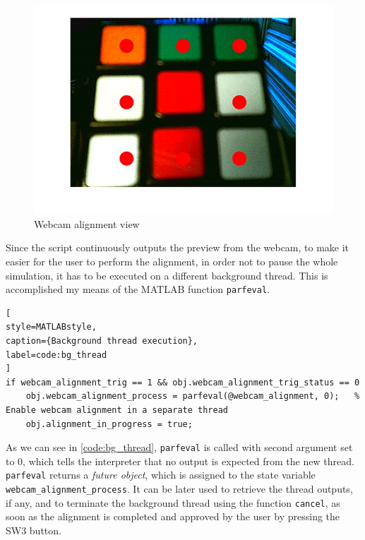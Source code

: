 \documentclass{report}
\begin{document}
\begin{figure}[h!]
    \centering
    \includegraphics[width=0.5\linewidth]{images/webcam_manager/alignment.jpg}
    \caption{Webcam alignment view}
    \label{fig:webcam_align_view}
\end{figure}

Since the script continuously outputs the preview from the webcam, to make it easier for the user to perform the alignment, in order not to pause the whole simulation, it has to be executed on a different background thread. This is accomplished my means of the MATLAB function \texttt{parfeval}.

\begin{lstlisting}[
style=MATLABstyle,
caption={Background thread execution},
label=code:bg_thread
]
if webcam_alignment_trig == 1 && obj.webcam_alignment_trig_status == 0
    obj.webcam_alignment_process = parfeval(@webcam_alignment, 0);   % Enable webcam alignment in a separate thread
    obj.alignment_in_progress = true;
\end{lstlisting}

As we can see in \ref{code:bg_thread}, \texttt{parfeval} is called with second argument set to 0, which tells the interpreter that no output is expected from the new thread. \texttt{parfeval} returns a \textit{future object}, which is assigned to the state variable \texttt{webcam\_alignment\_process}. It can be later used to retrieve the thread outputs, if any, and to terminate the background thread using the function \texttt{cancel}, as soon as the alignment is completed and approved by the user by pressing the SW3 button.
\end{document}
